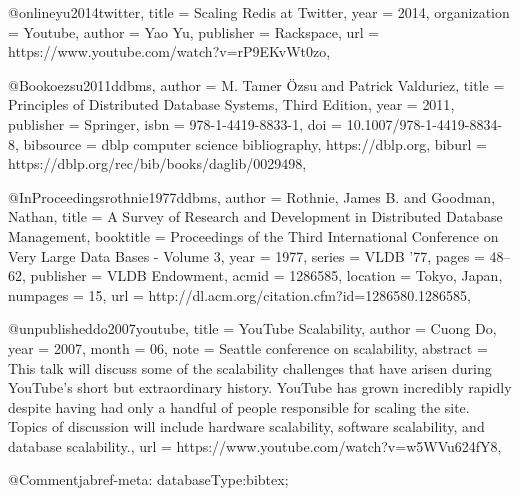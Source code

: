 @online{yu2014twitter,
  title = {Scaling Redis at Twitter},
  year = {2014},
  organization = {Youtube},
  author = {Yao Yu},
  publisher = {Rackspace},
  url = {https://www.youtube.com/watch?v=rP9EKvWt0zo},
}

@Book{oezsu2011ddbms,
  author    = {M. Tamer {\"{O}}zsu and Patrick Valduriez},
  title     = {Principles of Distributed Database Systems, Third Edition},
  year      = {2011},
  publisher = {Springer},
  isbn      = {978-1-4419-8833-1},
  doi       = {10.1007/978-1-4419-8834-8},
  bibsource = {dblp computer science bibliography, https://dblp.org},
  biburl    = {https://dblp.org/rec/bib/books/daglib/0029498},
}

@InProceedings{rothnie1977ddbms,
  author    = {Rothnie, James B. and Goodman, Nathan},
  title     = {A Survey of Research and Development in Distributed Database Management},
  booktitle = {Proceedings of the Third International Conference on Very Large Data Bases - Volume 3},
  year      = {1977},
  series    = {VLDB '77},
  pages     = {48--62},
  publisher = {VLDB Endowment},
  acmid     = {1286585},
  location  = {Tokyo, Japan},
  numpages  = {15},
  url       = {http://dl.acm.org/citation.cfm?id=1286580.1286585},
}

@unpublished{do2007youtube,
  title         = {YouTube Scalability},
  author        = {Cuong Do},
  year          = {2007},
  month         = {06},
  note          = {Seattle conference on scalability},
  abstract      = {This talk will discuss some of the scalability challenges that have arisen during YouTube's short but extraordinary history. YouTube has grown incredibly rapidly despite having had only a handful of people responsible for scaling the site. Topics of discussion will include hardware scalability, software scalability, and database scalability.},
  url           = {https://www.youtube.com/watch?v=w5WVu624fY8},
}

@Comment{jabref-meta: databaseType:bibtex;}
